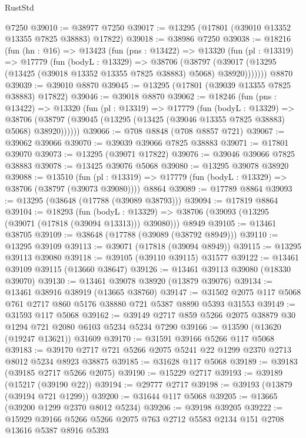 \begin{lexlean}{RustStd}
\begin{coremodule}
    @7250
@39010 := @38977 @7250
@39017 := @13295 (@17801 (@39010 @13352 @13355 @7825 @38883) @17822)
@39018 := @38986 @7250
@39038 := @18216
    (fun (hn : @16) =>
    @13423
      (fun (pns : @13422) =>
      @13320
        (fun (pl : @13319) =>
        @17779
          (fun (bodyL : @13329) =>
          @38706
            (@38797 (@39017 (@13295 (@13425 (@39018 @13352 @13355 @7825 @38883) @5068) @38920)))))))
    @8870
@39039 := @39010 @8870
@39045 := @13295 (@17801 (@39039 @13355 @7825 @38883) @17822)
@39046 := @39018 @8870
@39062 := @18246
    (fun (pns : @13422) =>
    @13320
      (fun (pl : @13319) =>
      @17779
        (fun (bodyL : @13329) =>
        @38706 (@38797 (@39045 (@13295 (@13425 (@39046 @13355 @7825 @38883) @5068) @38920))))))
@39066 := @708 @8848 (@708 @8857 @721)
@39067 := @39062 @39066
@39070 := @39039 @39066 @7825 @38883
@39071 := @17801 @39070
@39073 := @13295 (@39071 @17822)
@39076 := @39046 @39066 @7825 @38883
@39078 := @13425 @39076 @5068
@39080 := @13295 @39078 @38920
@39088 := @13510
    (fun (pl : @13319) => @17779 (fun (bodyL : @13329) => @38706 (@38797 (@39073 @39080))))
    @8864
@39089 := @17789 @8864
@39093 := @13295 (@38648 (@17788 (@39089 @38793)))
@39094 := @17819 @8864
@39104 := @18293
    (fun (bodyL : @13329) => @38706 (@39093 (@13295 (@39071 (@17818 (@39094 @13313))) @39080)))
    @8949
@39105 := @13461 @38705
@39109 := @38648 (@17788 (@39089 (@38792 @8949)))
@39110 := @13295 @39109
@39113 := @39071 (@17818 (@39094 @8949))
@39115 := @13295 @39113 @39080
@39118 := @39105 (@39110 @39115) @31577
@39122 := @13461 @39109 @39115 (@13660 @38647)
@39126 := @13461 @39113 @39080 (@18330 @39070)
@39130 := @13461 @39078 @38920 (@13879 @39076)
@39134 := @13461 @38916 @38919 (@13665 @38760)
@39147 := @31502 @2075 @117 @5068 @761 @2717 @860 @5176 @38880 @721 @5387 @8890 @5393 @31553
@39149 := @31593 @117 @5068
@39162 := @39149 @2717 @859 @5266 @2075 @38879 @30 @1294 @721 @2080 @6103 @5234 @5234 @7290
@39166 := @13590 (@13620 (@19247 @13621)) @31609
@39170 := @31591 @39166 @5266 @117 @5068
@39183 := @39170 @2717 @721 @5266 @2075 @5241 @22 @1299 @2370 @2713 @8012 @5234 @8923 @38875
@39185 := @31628 @117 @5068
@39189 := @39183 (@39185 @2717 @5266 @2075)
@39190 := @15229 @2717
@39193 := @39189 (@15217 (@39190 @22))
@39194 := @29777 @2717
@39198 := @39193 (@13879 (@39194 @721 @1299))
@39200 := @31644 @117 @5068
@39205 := @13665 (@39200 @1299 @2370 @8012 @5234)
@39206 := @39198 @39205
@39222 := @15929
    @39166
    @5266
    @5266
    @2075
    @763
    @2712
    @5583
    @2134
    @151
    @2708
    @13616
    @5387
    @8916
    @5393

\end{coremodule}
\end{lexlean}
